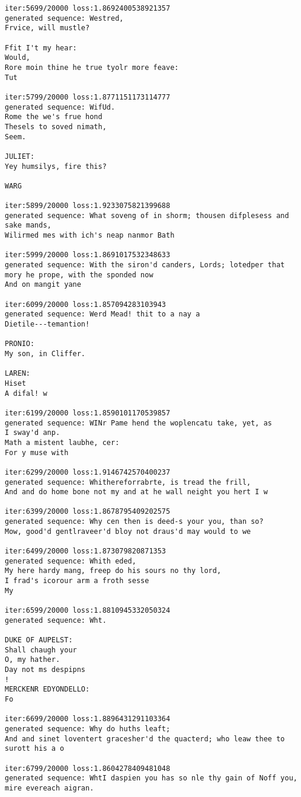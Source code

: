 \documentclass[11pt]{article}
\begin{document}
\begin{Verbatim}[commandchars=\\\{\}]
iter:5699/20000 loss:1.8692400538921357
generated sequence: Westred,
Frvice, will mustle?

Ffit I't my hear:
Would,
Rore moin thine he true tyolr more feave:
Tut

iter:5799/20000 loss:1.8771151173114777
generated sequence: WifUd.
Rome the we's frue hond
Thesels to soved nimath,
Seem.

JULIET:
Yey humsilys, fire this?

WARG

iter:5899/20000 loss:1.9233075821399688
generated sequence: What soveng of in shorm; thousen difplesess and sake mands,
Wilirmed mes with ich's neap nanmor Bath 

iter:5999/20000 loss:1.8691017532348633
generated sequence: With the siron'd canders, Lords; lotedper that mory he prope, with the sponded now
And on mangit yane

iter:6099/20000 loss:1.857094283103943
generated sequence: Werd Mead! thit to a nay a
Dietile---temantion!

PRONIO:
My son, in Cliffer.

LAREN:
Hiset
A difal! w

iter:6199/20000 loss:1.8590101170539857
generated sequence: WINr Pame hend the woplencatu take, yet, as
I sway'd anp.
Math a mistent laubhe, cer:
For y muse with

iter:6299/20000 loss:1.9146742570400237
generated sequence: Whithereforrabrte, is tread the frill,
And and do home bone not my and at he wall neight you hert I w

iter:6399/20000 loss:1.8678795409202575
generated sequence: Why cen then is deed-s your you, than so?
Mow, good'd gentlraveer'd bloy not draus'd may would to we 

iter:6499/20000 loss:1.873079820871353
generated sequence: Whith eded,
My here hardy mang, freep do his sours no thy lord,
I frad's icorour arm a froth sesse
My

iter:6599/20000 loss:1.8810945332050324
generated sequence: Wht.

DUKE OF AUPELST:
Shall chaugh your
O, my hather. 
Day not ms despipns
!
MERCKENR EDYONDELLO:
Fo

iter:6699/20000 loss:1.8896431291103364
generated sequence: Why do huths leaft;
And and sinet loventert gracesher'd the quacterd; who leaw thee to surott his a o

iter:6799/20000 loss:1.8604278409481048
generated sequence: WhtI daspien you has so nle thy gain of Noff you, mire evereach aigran.


\end{Verbatim}
\end{document}
